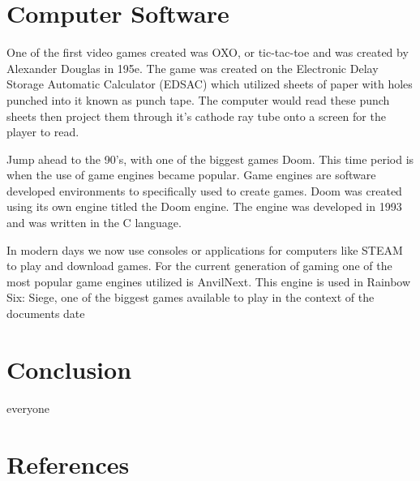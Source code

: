 \documentclass[letterpaper, 10 pt, conference]{IEEEconf}
\begin{document}
\section{Computer Software}
One of the first video games created was OXO, or tic-tac-toe and was created by Alexander 
Douglas in 195e. The game was created on the Electronic Delay Storage Automatic Calculator 
(EDSAC) which utilized sheets of paper with holes punched into it known as punch tape. The 
computer would read these punch sheets then project them through it’s cathode ray tube onto 
a screen for the player to read.

Jump ahead to the 90’s, with one of the biggest games Doom. This time period is when the use of 
game engines became popular. Game engines are software developed environments to specifically used 
to create games. Doom was created using its own engine titled the Doom engine. The engine was developed 
in 1993 and was written in the C language. 

In modern days we now use consoles or applications for computers like STEAM to play and download games. 
For the current generation of gaming one of the most popular game engines utilized is AnvilNext. This 
engine is used in Rainbow Six: Siege, one of the biggest games available to play in the context of the 
documents date
\section{Conclusion}
everyone
\section{References}
\end{document}

